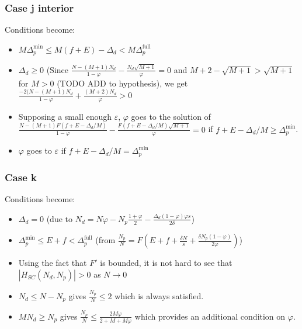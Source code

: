 \documentclass[english, a4paper]{article}
\theoremstyle{plain}
\theoremstyle{definition}
\theoremstyle{remark}
\begin{document}
    \subsubsection{Case j interior}

    Conditions become:
    \begin{itemize}
        \item $M\Delta_p^{\text{min}} \leq M(f + E) - \Delta_d < M\Delta_p^{\text{full}}$
        \item $\Delta_d \geq 0$ (Since $\frac{N - (M + 1)N_d}{1 -\varphi} - \frac{N_d\sqrt{M+1}}{\varphi} = 0$ and $M + 2 - \sqrt{M + 1} > \sqrt{M + 1}$ for $M > 0$ (TODO ADD to hypothesis), we get $\frac{-2(N - (M + 1)N_d}{1 - \varphi} + \frac{(M + 2)N_d}{\varphi} > 0$
        \item Supposing a small enough $\varepsilon$, $\varphi$ goes to the solution of $\frac{N - (M + 1) F(f + E - \Delta_d / M)}{1 - \varphi} - \frac{F(f + E - \Delta_d / M) \sqrt{M + 1}}{\varphi} = 0$ if $f + E - \Delta_d / M \geq \Delta_p^{\text{min}}$.
        \item $\varphi$ goes to $\varepsilon$ if $f + E - \Delta_d / M = \Delta_p^{\text{min}}$
    \end{itemize}

    
    \subsubsection{Case k}
    Conditions become:
    \begin{itemize}
        \item $\Delta_d = 0$ (due to $N_d = N\varphi - N_p \frac{1 + \varphi}{2} - \frac{\Delta_d(1 - \varphi)\varphi s}{2\delta}$)
        \item $\Delta_p^{\text{min}} \leq E + f < \Delta_p^{\text{full}}$ (from $\frac{N_p}{N} = F \left( E + f + \frac{\delta N}{s} + \frac{\delta N_p (1 - \varphi)}{2 \varphi} \right)$)
        \item Using the fact that $F'$ is bounded, it is not hard to see that $|H_{SC}(N_d, N_p)| >0 $ as $N\rightarrow 0$
        \item $N_d \leq N - N_p$ gives $\frac{N_p}{N} \leq 2$ which is always satisfied.
        \item $MN_d \geq N_p$ gives $\frac{N_p}{N} \leq \frac{2 M \varphi}{2 + M + M\varphi}$ which provides an additional condition on $\varphi$.
    \end{itemize}
\end{document}
